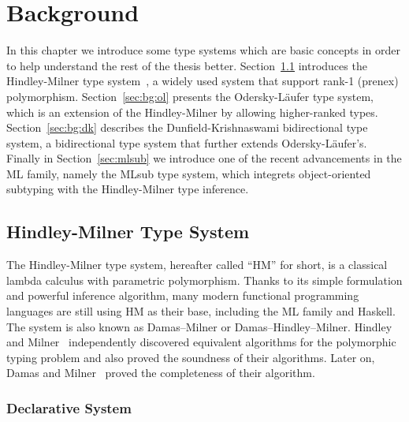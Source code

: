 \chapter{Background}
\label{chap:Background}

In this chapter we introduce some type systems which are basic concepts
in order to help understand the rest of the thesis better.
Section~\ref{sec:bg:hm} introduces the
Hindley-Milner type system~\citep{hindley1969principal,
milner1978theory,damas1982principal},
a widely used system that support rank-1 (prenex) polymorphism.
Section~\ref{sec:bg:ol} presents the Odersky-L\"aufer type system,
which is an extension of the Hindley-Milner by allowing higher-ranked types.
Section~\ref{sec:bg:dk} describes the Dunfield-Krishnaswami
bidirectional type system,
a bidirectional type system that further extends Odersky-L\"aufer's.
Finally in Section~\ref{sec:mlsub} we introduce
one of the recent advancements in the ML family,
namely the MLsub type system,
which integrets object-oriented subtyping with the Hindley-Milner type inference.


\section{Hindley-Milner Type System}\label{sec:bg:hm}

The Hindley-Milner type system, hereafter called ``HM'' for short,
is a classical lambda calculus with parametric polymorphism.
Thanks to its simple formulation and powerful inference algorithm,
many modern functional programming languages are still using HM as their base,
including the ML family and Haskell.
The system is also known as Damas–Milner or Damas–Hindley–Milner.
Hindley~\citep{hindley1969principal} and Milner~\citep{milner1978theory}
independently discovered equivalent algorithms for the polymorphic typing problem
and also proved the soundness of their algorithms.
Later on, Damas and Milner~\citep{damas1982principal} proved the completeness of their
algorithm.

\subsection{Declarative System}

